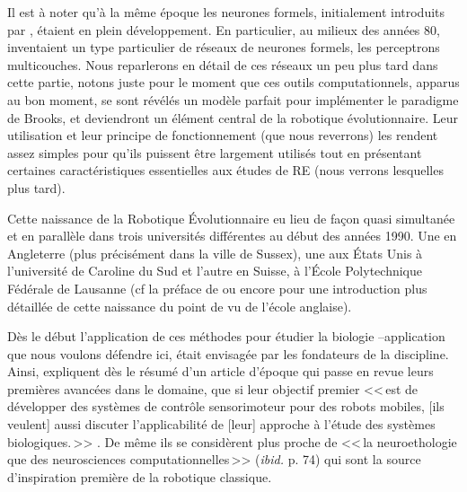 Il est à noter qu'à la même époque les neurones formels, initialement introduits par \cite{mcculloch1943alogicalcideaimmanervacti}, étaient en plein développement. En particulier, au milieux des années 80, \cite{rumelhart1986learninginternalrepresentationsbyerrorpropagation} inventaient un type particulier de réseaux de neurones formels, les perceptrons multicouches. Nous reparlerons en détail de ces réseaux un peu plus tard dans cette partie, notons juste pour le moment que ces outils computationnels, apparus au bon moment, se sont révélés un modèle parfait pour implémenter le paradigme de Brooks, et deviendront un élément central de la robotique évolutionnaire. Leur utilisation et leur principe de fonctionnement (que nous reverrons) les rendent assez simples pour qu'ils puissent être largement utilisés tout en présentant certaines caractéristiques essentielles aux études de RE (nous verrons lesquelles plus tard).

Cette naissance de la Robotique \'Evolutionnaire eu lieu de fa\c{c}on quasi simultanée et en parallèle dans trois universités différentes au début des années 1990. Une en Angleterre (plus précisément dans la ville de Sussex), une aux \'Etats Unis à l'université de Caroline du Sud et l'autre en Suisse, à l'\'Ecole Polytechnique Fédérale de Lausanne (cf la préface de \cite{nolfi00evolrobobiolintetechselfmach} ou encore \citet{harvey97evolutionaryroboticssussexapproach} pour une introduction plus détaillée de cette naissance du point de vu de l'école anglaise).

Dès le début l'application de ces méthodes pour étudier la biologie --application que nous voulons défendre ici, était envisagée par les fondateurs de la discipline. Ainsi, \cite{cliff93explorationsinevolutionaryrobotics} expliquent dès le résumé d'un article d'époque qui passe en revue leurs premières avancées dans le domaine, que si leur objectif premier <<\,est de développer des systèmes de contrôle sensorimoteur pour des robots mobiles, [ils veulent] aussi discuter l'applicabilité de [leur] approche à l'étude des systèmes biologiques.\,>> \citep[p. 73]{cliff93explorationsinevolutionaryrobotics}. De même ils se considèrent plus proche de <<\,la neuroethologie que des neurosciences computationnelles\,>> (\emph{ibid.} p. 74) qui sont la source d'inspiration première de la robotique classique.

